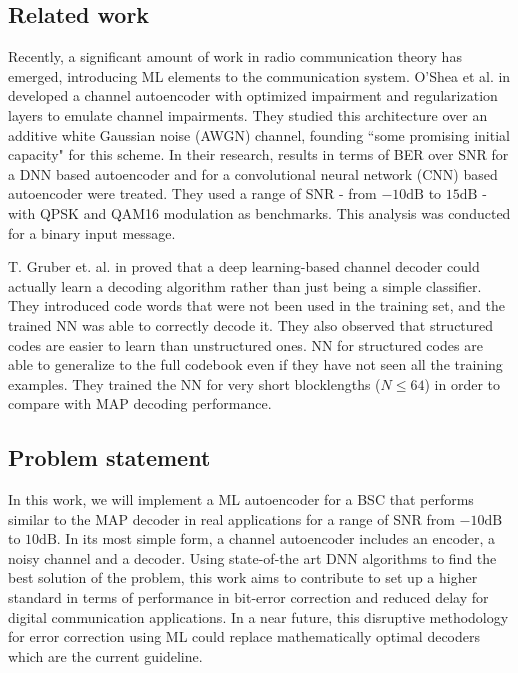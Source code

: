 \documentclass[conference]{IEEEtran}
\begin{document}
\subsection{Related work}

Recently, a significant amount of work in radio communication theory has emerged, introducing ML elements to the communication system. O'Shea et al. in \cite{2016arXiv160806409O} developed a channel autoencoder with optimized impairment and regularization layers to emulate channel impairments. They studied this architecture over an additive white Gaussian noise (AWGN) channel, founding ``some promising initial capacity" for this scheme. In their research, results in terms of BER over SNR for a DNN based autoencoder and for a convolutional neural network (CNN) based autoencoder were treated. They used a range of SNR - from $-10 \text{dB}$ to $15 \text{dB}$ - with QPSK and QAM16 modulation as benchmarks. This analysis was conducted for a binary input message.

    
T. Gruber et. al. in \cite{2017arXiv171008379G} proved that a deep learning-based channel decoder could actually learn a decoding algorithm rather than just being a simple classifier. They introduced code words that were not been used in the training set, and the trained NN was able to correctly decode it. They also observed that structured codes are easier to learn than unstructured ones. NN for structured codes are able to generalize to the full codebook even if they have not seen all the training examples. They trained the NN for very short blocklengths ($N \leq 64$) in order to compare with MAP decoding performance.

\subsection{Problem statement}

In this work, we will implement a ML autoencoder for a  BSC that performs similar to the MAP decoder in real applications for a range of SNR from $-10 \text{dB}$ to $10 \text{dB}$. In its most simple form, a channel autoencoder includes an encoder, a noisy channel and a decoder. Using state-of-the art DNN algorithms to find the best solution of the problem, this work aims to contribute to set up a higher standard in terms of performance in bit-error correction and reduced delay for digital communication applications. In a near future, this disruptive methodology for error correction using ML could replace mathematically optimal decoders which are the current guideline.
\end{document}
